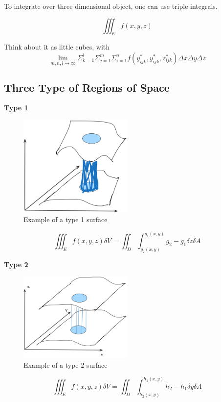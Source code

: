\documentclass{article}
\begin{document}
To integrate over three dimensional object, one can use triple integrals.

$$\iiint_E f(x, y, z)$$

Think about it as little cubes, with $$\lim_{m, n, l \to \infty} \Sigma_{k=1}^l \Sigma_{j = 1}^{m} \Sigma_{i = 1}^n f(y_{ijk}^*, y_{ijk}^*, z_{ijk}^*) \Delta x \Delta y \Delta z$$

\subsection{Three Type of Regions of Space}

\textbf{Type 1}

\begin{figure}[H]
    \centering
    \includegraphics[width=0.5\textwidth]{figures/RegionISpace.png}
    \caption{Example of a type 1 surface}
\end{figure}

$$\iiint_E f(x, y, z) \delta V = \iint_D \int_{g_2(x, y)}^{g_1(x, y)} g_2 - g_1 \delta z \delta A$$

\textbf{Type 2}

\begin{figure}[H]
    \centering
    \includegraphics[width=0.5\textwidth]{figures/type2surfaces.png}
    \caption{Example of a type 2 surface}
\end{figure}

$$\iiint_E f(x, y, z) \delta V = \iint_D \int_{h_2(x, y)}^{h_1(x, y)} h_2 - h_1 \delta y \delta A$$
\end{document}
